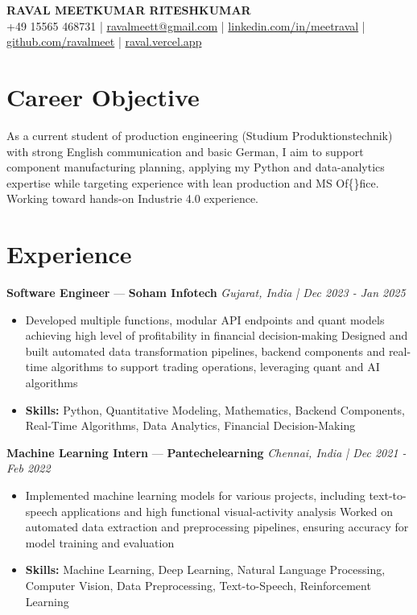 \documentclass[a4paper,10pt]{article}
\begin{document}
\begin{center}
  {\Large\bfseries RAVAL MEETKUMAR RITESHKUMAR}\\[2pt]
  {\small +49 15565 468731 \;|\; \href{mailto:ravalmeett@gmail.com}{ravalmeett@gmail.com} \;|\; \href{https://www.linkedin.com/in/meetraval/}{linkedin.com/in/meetraval} \;|\; \href{https://github.com/ravalmeet}{github.com/ravalmeet} \;|\; \href{https://raval.vercel.app/}{raval.vercel.app}}
\end{center}
\vspace{-3pt}

\section*{Career Objective}
As a current student of production engineering (Studium Produktionstechnik) with strong English communication and basic German, I aim to support component manufacturing planning, applying my Python and data-analytics expertise while targeting experience with lean production and MS Of\{\}fice. Working toward hands-on Industrie 4.0 experience.\par

\section*{Experience}
\textbf{Software Engineer} — \textbf{Soham Infotech} \hfill \textit{Gujarat, India \;|\; Dec 2023 - Jan 2025}\par
\vspace{1pt}
\begin{itemize}
  \item Developed multiple functions, modular API endpoints and quant models achieving high level of profitability in financial decision-making Designed and built automated data transformation pipelines, backend components and real-time algorithms to support trading operations, leveraging quant and AI algorithms
  \item \textbf{Skills:} Python, Quantitative Modeling, Mathematics, Backend Components, Real-Time Algorithms, Data Analytics, Financial Decision-Making
\end{itemize}
\vspace{3pt}
\textbf{Machine Learning Intern} — \textbf{Pantechelearning} \hfill \textit{Chennai, India \;|\; Dec 2021 - Feb 2022}\par
\vspace{1pt}
\begin{itemize}
  \item Implemented machine learning models for various projects, including text-to-speech applications and high functional visual-activity analysis Worked on automated data extraction and preprocessing pipelines, ensuring accuracy for model training and evaluation
  \item \textbf{Skills:} Machine Learning, Deep Learning, Natural Language Processing, Computer Vision, Data Preprocessing, Text-to-Speech, Reinforcement Learning
\end{itemize}
\end{document}
